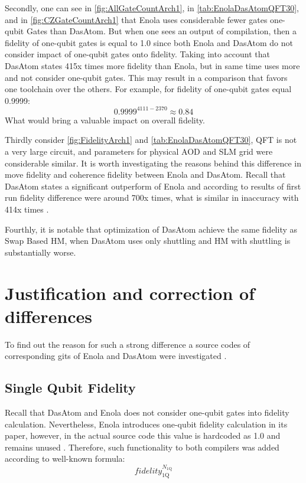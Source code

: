 Secondly, one can see in \ref{fig:AllGateCountArch1}, in \ref{tab:EnolaDasAtomQFT30}, 
and in \ref{fig:CZGateCountArch1} that Enola uses considerable fewer gates one-qubit Gates than DasAtom. 
But when one sees an output of compilation, 
then a fidelity of one-qubit gates is equal to 1.0 
since both Enola and DasAtom do not consider impact of one-qubit gates onto fidelity.
Taking into account that DasAtom states 415x times more fidelity than Enola, 
but in same time uses more and not consider one-qubit gates. This may result in a comparison that favors one toolchain over the others.
For example, for fidelity of one-qubit gates equal 0.9999: \[0.9999^{4111 - 2370} \approx 0.84\]
What would bring a valuable impact on overall fidelity.

Thirdly consider \ref{fig:FidelityArch1} and \ref{tab:EnolaDasAtomQFT30}, \ac{QFT} is not a very large circuit, 
and parameters for physical \ac{AOD} and \ac{SLM} grid were considerable similar.
It is worth investigating the reasons behind this difference in move fidelity and coherence fidelity between Enola and DasAtom.
Recall that DasAtom states a significant outperform of Enola and according to results of first run fidelity difference were around 700x times, 
what is similar in inaccuracy with 414x times \parencite{huang2025dasatomdivideandshuttleatomapproach}.

Fourthly, it is notable that optimization of DasAtom achieve the same fidelity as Swap Based \ac{HM}, 
when DasAtom uses only shuttling and \ac{HM} with shuttling is substantially worse.

\section{Justification and correction of differences}
To find out the reason for such a strong difference a source codes of corresponding gits 
of Enola \parencite{Tan_2025_Enola} and DasAtom \parencite{huang2025dasatomdivideandshuttleatomapproach} were investigated \parencite{Emil_Khusainov_Bachelor_GIT}.

\subsection{Single Qubit Fidelity}
Recall that DasAtom and Enola does not consider one-qubit gates into fidelity calculation.
Nevertheless, Enola introduces one-qubit fidelity calculation in its paper, 
however, in the actual source code this value is hardcoded as 1.0 and remains unused \parencite{Emil_Khusainov_Bachelor_GIT,Tan_2025_Enola}.
Therefore, such functionality to both compilers was added according to well-known formula: \[fidelity_{\mathrm{1Q}}^{N_{\mathrm{1Q}}}\]

